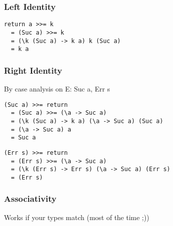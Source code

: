 \documentclass{beamer}
\begin{document}
\begin{frame}[fragile]
\frametitle{Left Identity}
\begin{lstlisting}
return a >>= k 
  = (Suc a) >>= k 
  = (\k (Suc a) -> k a) k (Suc a) 
  = k a
\end{lstlisting}
\end{frame}

\begin{frame}[fragile]
\frametitle{Right Identity}
By case analysis on E: Suc a, Err s
\begin{lstlisting}
(Suc a) >>= return 
  = (Suc a) >>= (\a -> Suc a)
  = (\k (Suc a) -> k a) (\a -> Suc a) (Suc a)
  = (\a -> Suc a) a
  = Suc a
\end{lstlisting}
\begin{lstlisting}
(Err s) >>= return
  = (Err s) >>= (\a -> Suc a)
  = (\k (Err s) -> Err s) (\a -> Suc a) (Err s)
  = (Err s)
\end{lstlisting}
\end{frame}

\begin{frame}[fragile]
\frametitle{Associativity}
Works if your types match (most of the time ;))
\end{frame}
\end{document}
